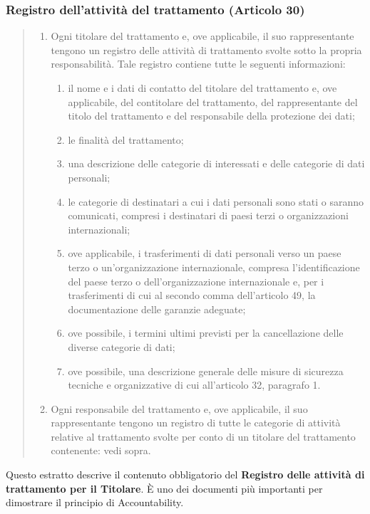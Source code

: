 \subsubsection*{Registro dell'attività del trattamento (Articolo 30)}
\begin{quote}
    \begin{enumerate}
        \item Ogni titolare del trattamento e, ove applicabile, il suo rappresentante tengono un registro delle attività di trattamento svolte sotto la propria responsabilità. Tale registro contiene tutte le seguenti informazioni:
            \begin{enumerate}[label=\alph*)]
                \item il nome e i dati di contatto del titolare del trattamento e, ove applicabile, del contitolare del trattamento, del rappresentante del titolo del trattamento e del responsabile della protezione dei dati;
                \item le finalità del trattamento;
                \item una descrizione delle categorie di interessati e delle categorie di dati personali;
                \item le categorie di destinatari a cui i dati personali sono stati o saranno comunicati, compresi i destinatari di paesi terzi o organizzazioni internazionali;
                \item ove applicabile, i trasferimenti di dati personali verso un paese terzo o un'organizzazione internazionale, compresa l'identificazione del paese terzo o dell'organizzazione internazionale e, per i trasferimenti di cui al secondo comma dell'articolo 49, la documentazione delle garanzie adeguate;
                \item ove possibile, i termini ultimi previsti per la cancellazione delle diverse categorie di dati;
                \item ove possibile, una descrizione generale delle misure di sicurezza tecniche e organizzative di cui all'articolo 32, paragrafo 1.
            \end{enumerate}
        \item Ogni responsabile del trattamento e, ove applicabile, il suo rappresentante tengono un registro di tutte le categorie di attività relative al trattamento svolte per conto di un titolare del trattamento contenente: vedi sopra.
    \end{enumerate}
\end{quote}
Questo estratto descrive il contenuto obbligatorio del \textbf{Registro delle attività di trattamento per il Titolare}.
È uno dei documenti più importanti per dimostrare il principio di Accountability.
